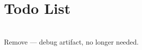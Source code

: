 \chapter{Todo List }
\hypertarget{todo}{}\label{todo}

\begin{DoxyRefList}
\item[{\parbox[t]{\linewidth}{Global \doxylink{class_game_model_ad949a6388331d36449a6f39b1e3ce8e3}{Game\+Model::\+a} }}]\hfill \\
\label{todo__todo000001}%
%
Remove — debug artifact, no longer needed. 
\end{DoxyRefList}